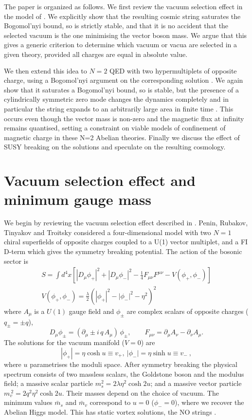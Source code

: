 \documentclass[a4paper,aps,prd,superscriptaddress,floats]{revtex4}
\begin{document}
The paper is organized as follows. We first review the vacuum
selection effect in the model of \cite{PRTT96}.  We explicitly show
that the resulting cosmic string saturates the Bogomol'nyi bound, so
is strictly stable, and that it is no accident that the selected
vacuum is the one minimising the vector boson mass. We argue that this
gives a generic criterion to determine which vacuum or vacua are
selected in a given theory, provided all charges are equal in absolute
value.

We then extend this idea to $N\!=\!2$ QED with two hypermultiplets of
opposite charge, using a Bogomol'nyi argument on the corresponding
solution \cite{edel}. 
We again show that it saturates a
Bogomol'nyi bound, so is stable, but the presence of a cylindrically
symmetric zero mode changes the dynamics completely and in particular
the string expands to an arbitrarily large area in finite time
\cite{H92,leese,AV00}. This occurs even though the vector mass is
non-zero and the magnetic flux at infinity remains quantised, setting
a constraint on viable models of confinement of magnetic charge in
these N=2 Abelian theories. Finally we discuss the effect of SUSY breaking on the solutions and
speculate on the resulting cosmology.

\section{Vacuum selection effect and minimum gauge mass}

We begin by reviewing the vacuum selection effect described in  
\cite{PRTT96}. Penin, Rubakov, Tinyakov and Troitsky considered a
four-dimensional model with two $N\!=\!1$ chiral superfields of
opposite charges coupled to a U(1) vector multiplet, and a
FI  D-term which gives the symmetry breaking potential. The action of
the bosonic sector is
\begin{eqnarray}
&S =\!\! \int d^4x\left[|D_\mu \phi_+|^2 + |D_\mu \phi_-|^2- \frac14{F_{\mu\nu} F^{\mu\nu}} 
- V(\phi_+,\phi_-)\right]&\nonumber\\
&V(\phi_+,\phi_-)={\frac\lambda 2}(|\phi_+|^2 - |\phi_-|^2 - \eta^2)^2&\label{v}
\end{eqnarray}
where $A_\mu$ is a $U(1)$ gauge field 
and $\phi_\pm$ are 
complex scalars of opposite charges ($q_{\pm}=\pm q$),
\[
D_{\mu}\phi_{\pm} = (\partial_{\mu} \pm i\, q\, A_{\mu})\,\phi_\pm, \qquad
F_{\mu\nu} = \partial_\mu A_\nu - \partial_\nu A_\mu.
\]
The solutions for the vacuum manifold ($V=0$) are 
\begin{equation}
|\phi_+| = \eta \cosh u \equiv v_+, \ |\phi_-| = \eta \sinh u \equiv v_- \ ,
\label{vacman}
\end{equation}
where  $u$ parametrises the moduli space. After symmetry breaking the
physical spectrum consists of two massless scalars, the Goldstone boson 
and the modulus field; a massive scalar particle $m_s^2=2\lambda\eta^2
\cosh 2u$; and a massive vector particle $m_v^{\ 2}= 2 q^2 \eta^2 \cosh 2u$.
Their masses depend on the choice of vacuum.  
The minimum values ${\bar m_s}$ and 
${\bar m_v}$ correspond to $u=0$ ($\phi_-=0$), where we recover the Abelian
 Higgs model. This has static vortex solutions, the NO strings \cite{NO73}. 
\end{document}
